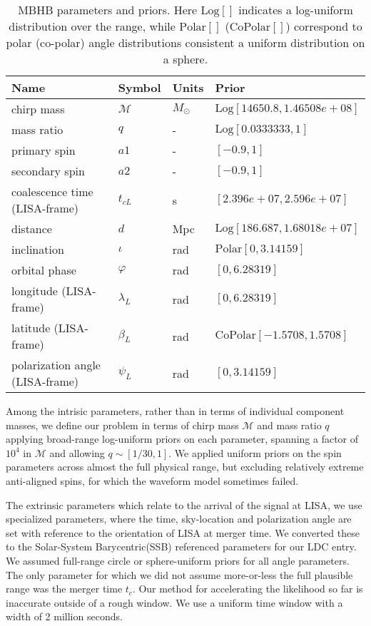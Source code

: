 \documentclass[aps,showpacs,12pt,onecolumn,prd,superscriptaddress,nofootinbib]{revtex4}
\newcommand{\Msol}{M_{\odot}}
\newcommand\mc{{\mathcal{M}}}
\begin{document}
\begin{table}
  \label{tab:prior}
  \centering
  \begin{tabular}{llll}
    Name & Symbol & Units & Prior \\
    \hline
    chirp mass & $\mc$ & $\Msol$ & $\mathrm{Log}[14650.8,1.46508e+08]$\\
    mass ratio & $q$ & - &$\mathrm{Log}[0.0333333,1]$\\
    primary spin & $a1$ & - & $[-0.9,1]$\\
    secondary spin & $a2$ & - & $[-0.9,1]$\\
    coalescence time (LISA-frame) & $t_{cL}$ & s & $[2.396e+07,2.596e+07]$\\
    distance & $d$ & Mpc & $\mathrm{Log}[186.687,1.68018e+07]$\\
    inclination & $\iota$ & rad & $\mathrm{Polar}[0,3.14159]$\\
    orbital phase & $\varphi$ & rad & $[0,6.28319]$\\
    longitude (LISA-frame) & $\lambda_L$ & rad & $[0,6.28319]$\\
    latitude (LISA-frame) &$\beta_L$ & rad & $\mathrm{CoPolar}[-1.5708,1.5708]$\\
    polarization angle (LISA-frame) & $\psi_L$ & rad & $[0,3.14159]$\\
    \hline
  \end{tabular}
  \caption{ MBHB parameters and priors. Here $\mathrm{Log}[]$ indicates a log-uniform distribution over the range, while $\mathrm{Polar}[]$ ($\mathrm{CoPolar}[]$) correspond to polar (co-polar) angle distributions consistent a uniform distribution on a sphere.}
\end{table}

Among the intrisic parameters, rather than in terms of individual component masses, we define our problem in terms of chirp mass $\mc$ and mass ratio $q$ applying broad-range log-uniform priors on each parameter, spanning a factor of $10^4$ in $\mc$ and allowing $q \sim [1/30,1]$.  We applied uniform priors on the spin parameters across almost the full physical range, but excluding relatively extreme anti-aligned spins, for which the waveform model sometimes failed.

The extrinsic parameters which relate to the arrival of the signal at LISA, we use specialized parameters, where the time, sky-location and polarization angle are set with reference to the orientation of LISA at merger time.  We converted these to the Solar-System Barycentric(SSB) referenced parameters for our LDC entry.  We assumed full-range circle or sphere-uniform priors for all angle parameters. The only parameter for which we did not assume more-or-less the full plausible range was the merger time $t_c$.  Our method for accelerating the likelihood so far is inaccurate outside of a rough window. We use a uniform time window with a width of 2 million seconds.
\end{document}
